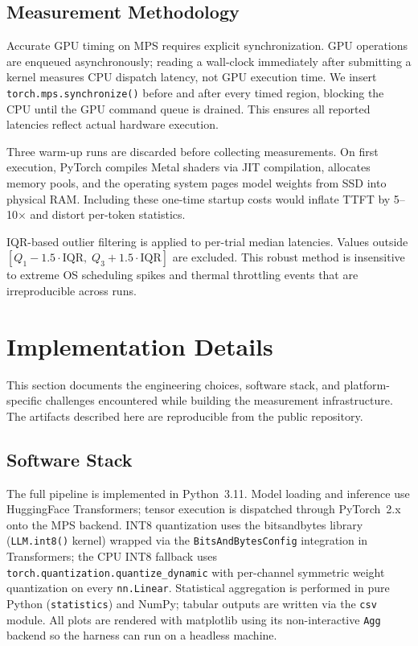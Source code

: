 \documentclass[conference]{IEEEtran}
\begin{document}
\subsection{Measurement Methodology}

Accurate GPU timing on MPS requires explicit synchronization. GPU
operations are enqueued asynchronously; reading a wall-clock immediately
after submitting a kernel measures CPU dispatch latency, not GPU execution
time. We insert \texttt{torch.mps.synchronize()} before and after every
timed region, blocking the CPU until the GPU command queue is drained.
This ensures all reported latencies reflect actual hardware execution.

Three warm-up runs are discarded before collecting measurements. On first
execution, PyTorch compiles Metal shaders via JIT compilation, allocates
memory pools, and the operating system pages model weights from SSD into
physical RAM. Including these one-time startup costs would inflate TTFT by
5--10$\times$ and distort per-token statistics.

IQR-based outlier filtering is applied to per-trial median latencies.
Values outside $[Q_1 - 1.5 \cdot \mathrm{IQR},\; Q_3 + 1.5 \cdot
\mathrm{IQR}]$ are excluded. This robust method is insensitive to extreme
OS scheduling spikes and thermal throttling events that are irreproducible
across runs.

\section{Implementation Details}
\label{sec:impl}

This section documents the engineering choices, software stack, and
platform-specific challenges encountered while building the measurement
infrastructure. The artifacts described here are reproducible from the
public repository.

\subsection{Software Stack}

The full pipeline is implemented in Python~3.11. Model loading and
inference use HuggingFace Transformers; tensor execution is dispatched
through PyTorch~2.x onto the MPS backend. INT8 quantization uses the
bitsandbytes library (\texttt{LLM.int8()} kernel) wrapped via the
\texttt{BitsAndBytesConfig} integration in Transformers; the CPU INT8
fallback uses \texttt{torch.quantization.quantize\_dynamic} with
per-channel symmetric weight quantization on every \texttt{nn.Linear}.
Statistical aggregation is performed in pure Python (\texttt{statistics})
and NumPy; tabular outputs are written via the \texttt{csv} module.
All plots are rendered with matplotlib using its non-interactive
\texttt{Agg} backend so the harness can run on a headless machine.
\end{document}
